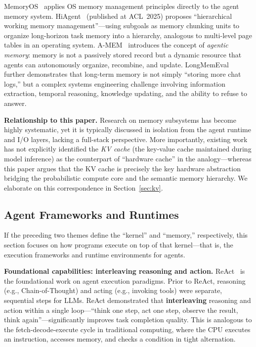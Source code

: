 \documentclass[11pt,a4paper]{article}
\begin{document}
MemoryOS~\cite{memoryos2025} applies OS memory management principles directly to the agent memory system.
HiAgent~\cite{hiagent2024} (published at ACL~2025) proposes ``hierarchical working memory management''---using subgoals as memory chunking units to organize long-horizon task memory into a hierarchy, analogous to multi-level page tables in an operating system.
A-MEM~\cite{amem2025} introduces the concept of \textit{agentic memory}: memory is not a passively stored record but a dynamic resource that agents can autonomously organize, recombine, and update.
LongMemEval~\cite{longmemeval2024} further demonstrates that long-term memory is not simply ``storing more chat logs,'' but a complex systems engineering challenge involving information extraction, temporal reasoning, knowledge updating, and the ability to refuse to answer.

\textbf{Relationship to this paper.}
Research on memory subsystems has become highly systematic, yet it is typically discussed in isolation from the agent runtime and I/O layers, lacking a full-stack perspective.
More importantly, existing work has not explicitly identified the \textit{KV cache} (the key-value cache maintained during model inference) as the counterpart of ``hardware cache'' in the analogy---whereas this paper argues that the KV cache is precisely the key hardware abstraction bridging the probabilistic compute core and the semantic memory hierarchy.
We elaborate on this correspondence in Section~\ref{sec:kv}.

\subsection{Agent Frameworks and Runtimes}
\label{sec:related-agent-framework}

If the preceding two themes define the ``kernel'' and ``memory,'' respectively, this section focuses on how programs execute on top of that kernel---that is, the execution frameworks and runtime environments for agents.

\textbf{Foundational capabilities: interleaving reasoning and action.}
ReAct~\cite{yao2023react} is the foundational work on agent execution paradigms.
Prior to ReAct, reasoning (e.g., Chain-of-Thought) and acting (e.g., invoking tools) were separate, sequential steps for LLMs.
ReAct demonstrated that \textbf{interleaving} reasoning and action within a single loop---``think one step, act one step, observe the result, think again''---significantly improves task completion quality.
This is analogous to the fetch-decode-execute cycle in traditional computing, where the CPU executes an instruction, accesses memory, and checks a condition in tight alternation.
\end{document}

